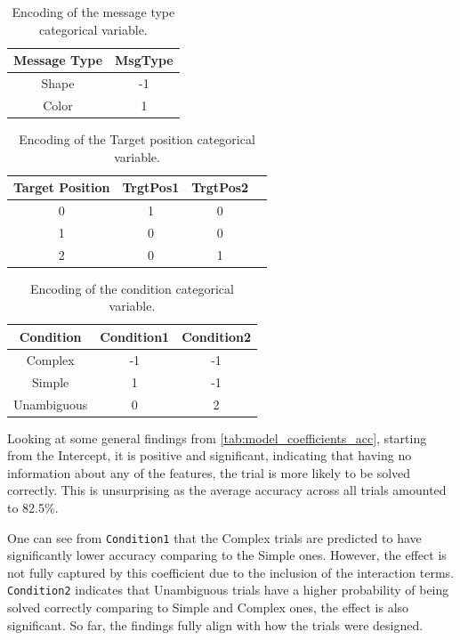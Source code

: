 \begin{table}[h!]
    \centering
    \begin{tabular}{|c|c|}
    \hline
    Message Type & MsgType \\ \hline
    Shape        & -1       \\ \hline
    Color        & 1        \\ \hline
    \end{tabular}
    \caption{Encoding of the message type categorical variable.}
    \label{tab:msgtype_encoding}
    \end{table}
    \hfill
    \begin{table}[h!]
    \centering
    \begin{tabular}{|c|c|c|c|}
    \hline
    Target Position & TrgtPos1 & TrgtPos2\\ \hline
    0               & 1    & 0    \\ \hline
    1               & 0    & 0    \\ \hline
    2               & 0    & 1    \\ \hline
    \end{tabular}
    \caption{Encoding of the Target position categorical variable.}
    \label{tab:trgtpos_encoding}
    \end{table}
    \begin{table}[h!]
    \centering
    \begin{tabular}{|c|c|c|}
    \hline
    Condition     & Condition1 & Condition2 \\ \hline
    Complex       & -1   & -1   \\ \hline
    Simple        & 1    & -1   \\ \hline
    Unambiguous   & 0    & 2    \\ \hline
    \end{tabular}
    \caption{Encoding of the condition categorical variable.}
    \label{tab:condition_encoding}
\end{table}


Looking at some general findings from \autoref{tab:model_coefficients_acc}, starting from the Intercept, it is positive and significant, indicating that having no information about any of the features, the trial is more likely to be solved correctly. This is unsurprising as the average accuracy across all trials amounted to 82.5\%. 

One can see from \texttt{Condition1} that the Complex trials are predicted to have significantly lower accuracy comparing to the Simple ones. However, the effect is not fully captured by this coefficient due to the inclusion of the interaction terms. \texttt{Condition2} indicates that Unambiguous trials have a higher probability of being solved correctly comparing to Simple and Complex ones, the effect is also significant. So far, the findings fully align with how the trials were designed. 


